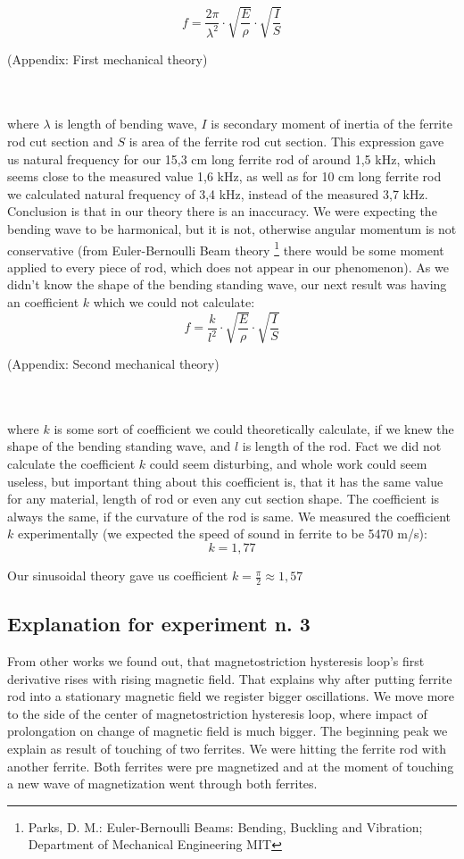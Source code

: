\documentclass[10pt,a4paper]{article}
\begin{document}
$$f=\frac{2\pi}{\lambda^{2}} \cdot \sqrt{\frac{E}{\rho}} \cdot \sqrt{\frac{I}{S}}$$  \centerline{(Appendix: First mechanical theory)}\\\mbox{}\\
where $\lambda$ is length of bending wave, $I$ is secondary moment of inertia of the ferrite rod cut section and $S$ is area of the ferrite rod cut section. This expression gave us natural frequency for our 15,3 cm long ferrite rod of around 1,5 kHz, which seems close to the measured value 1,6 kHz, as well as for 10 cm long ferrite rod we calculated natural frequency of 3,4 kHz, instead of the measured 3,7 kHz. Conclusion is that in our theory there is an inaccuracy. We were expecting the bending wave to be harmonical, but it is not, otherwise angular momentum is not conservative (from Euler-Bernoulli Beam theory
\footnote{\label{Euler} Parks, D. M.: Euler-Bernoulli Beams: Bending, Buckling and Vibration; Department of Mechanical Engineering MIT}
there would be some moment applied to every piece of rod, which does not appear in our phenomenon). As we didn’t know the shape of the bending standing wave, our next result was having an coefficient $k$ which we could not calculate:
$$f=\frac{k}{l^{2}} \cdot \sqrt{\frac{E}{\rho}} \cdot \sqrt{\frac{I}{S}}$$  
\centerline{(Appendix: Second mechanical theory)}\\\mbox{}\\
where $k$ is some sort of coefficient we could theoretically calculate, if we knew the shape of the bending standing wave, and $l$ is length of the rod.
Fact we did not calculate the coefficient $k$ could seem disturbing, and whole work could seem useless, but important thing about this coefficient is, that it has the same value for any material, length of rod or even any cut section shape. The coefficient is always the same, if the curvature of the rod is same. We measured the coefficient $k$ experimentally (we expected the speed of sound in ferrite to be 5470 m/s):
$$k = 1,77$$
\centerline{Our sinusoidal theory gave us coefficient $k=\frac{\pi}{2} \approx 1,57$}
\subsection{Explanation for experiment n. 3}
From other works we found out, that magnetostriction hysteresis loop’s first derivative rises with rising magnetic field. That explains why after putting ferrite rod into a stationary magnetic field we register bigger oscillations. We move more to the side of the center of magnetostriction hysteresis loop, where impact of prolongation on change of magnetic field is much bigger. The beginning peak we explain as result of touching of two ferrites. We were hitting the ferrite rod with another ferrite. Both ferrites were pre magnetized and at the moment of touching a new wave of magnetization went through both ferrites.
\end{document}
